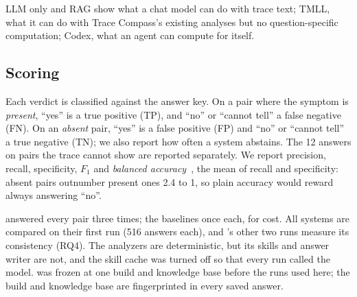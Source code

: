 LLM only and RAG show what a chat model can do with trace text; TMLL, what it can do with Trace Compass's existing analyses but no question-specific computation; Codex, what an agent can compute for itself.

\subsection{Scoring}

Each verdict is classified against the answer key. On a pair where the symptom is \emph{present}, ``yes'' is a true positive (TP), and ``no'' or ``cannot tell'' a false negative (FN). On an \emph{absent} pair, ``yes'' is a false positive (FP) and ``no'' or ``cannot tell'' a true negative (TN); we also report how often a system abstains. The 12 answers on pairs the trace cannot show are reported separately. We report precision, recall, specificity, $F_1$ and \emph{balanced accuracy}~\cite{brodersen2010balanced}, the mean of recall and specificity: absent pairs outnumber present ones 2.4 to 1, so plain accuracy would reward always answering ``no''.

\sysname answered every pair three times; the baselines once each, for cost. All systems are compared on their first run (516 answers each), and \sysname's other two runs measure its consistency (RQ4). The analyzers are deterministic, but its skills and answer writer are not, and the skill cache was turned off so that every run called the model. \sysname was frozen at one build and knowledge base before the runs used here; the build and knowledge base are fingerprinted in every saved answer.
